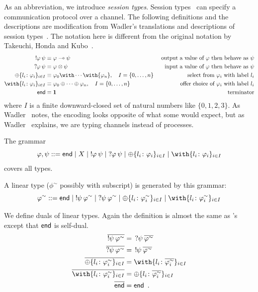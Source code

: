     As an abbreviation, we introduce \textit{session
    types}.
    Session types~\cite{interaction,honda-session} can specify a communication
    protocol over a channel.
    The following definitions and the descriptions are modification from
    Wadler's translations and descriptions of
    session types~\citep{wadler2012propositions}.  The notation here is
    different from the
    original notation by Takeuchi, Honda and Kubo~\citep{interaction}.
    \begin{align*}
     \sendtype\phi\psi&\equiv \phi\limp\psi &\text{
     output a value of $\phi$ then behave as $\psi$} \\
     \recvtype\phi\psi&\equiv \phi\otimes\psi &\text{input a value of
     $\phi$ then behave as $\psi$}\\
     \oplus\{l_i\colon \phi_i\}_{i\in I} &\equiv {\phi_0}\with
     \cdots \with {\phi_n}, \quad I = \{0,\ldots,n\} & \text{select from
     $\phi_i$ with label $l_i$}\\
     \with\{l_i\colon \phi_i\}_{i\in I} &\equiv {\phi_0}\oplus
     \cdots \oplus {\phi_n}, \quad I = \{0,\ldots,n\}& \text{offer choice of
     $\phi_i$ with label $l_i$}
     \\
     \terminate &\equiv \one &\text{terminator}
    \end{align*}
    where $I$ is a finite downward-closed set of natural numbers like
    $\{0,1,2,3\}$.
    As Wadler~\citep{wadler2012propositions} notes, the encoding looks
    opposite of what some would expect, but as
    Wadler~\citep{wadler2012propositions} explains, we are
    typing channels instead of processes.

    The grammar
    \[
     \phi,\psi ::= \terminate\mid X \mid \sendtype\phi\psi \mid
     \recvtype\phi\psi
     \mid \oplus\{l_i\colon\phi_i\}_{i\in I}
     \mid \with\{l_i\colon\phi_i\}_{i\in I}
    \]
    covers all types.

    A linear type ($\phi^\sim$ possibly with subscript) is generated by
    this grammar:
    \[
     \phi^\sim ::= \terminate\mid
     \sendtype{\psi}{\phi^\sim} \mid
     \recvtype{\psi}{\phi^\sim}
     \mid \oplus\{l_i\colon\phi^\sim_i\}_{i\in I}
     \mid \with\{l_i\colon\phi^\sim_i\}_{i\in I}
    \]

    We define duals of linear types.
    Again the definition is almost the
    same as \citet{wadler2012propositions}'s except that $\mathsf{end}$ is
    self-dual.
    \begin{align*}
     \overline{\sendtype\psi{\phi^\sim}}&= \,\recvtype\psi{\overline{\phi^\sim}}\\
     \overline{\recvtype\psi{\phi^\sim}}&= \,\sendtype\psi{\overline{\phi^\sim}}\\
     \overline{\oplus\{l_i\colon \phi^\sim_i\}_{i\in I}} &=
     \with\{l_i\colon \overline{\phi^\sim_i}\}_{i\in I} \\
     \overline{\with\{l_i\colon \phi^\sim_i\}_{i\in I}} &=
     \oplus\{l_i\colon \overline{\phi^\sim_i}\}_{i\in I} \\
     \overline{\terminate} &= \terminate\enspace.
    \end{align*}

